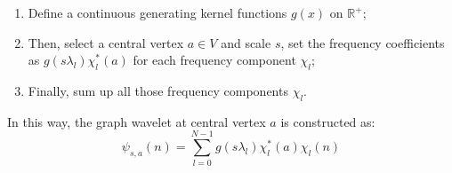 \begin{enumerate}
\item Define a continuous generating kernel functions $g(x)$ on $\mathbb{R}^+$;
\item Then, select a central vertex $a \in {V}$ and scale $s$, set the frequency coefficients as $g(s\lambda_l)\chi^*_l(a)$ for each frequency component $\chi_l$;
\item Finally, sum up all those frequency components $\chi_l$.
\end{enumerate}
In this way, the graph wavelet at central vertex $a$ is constructed as:
\begin{equation}
\label{eq:graphwaveletdefinition}
\psi_{s,a}(n) = \sum\limits_{l=0}^{N-1}g(s\lambda_l)\chi_l^*(a)\chi_l(n)
\end{equation}




